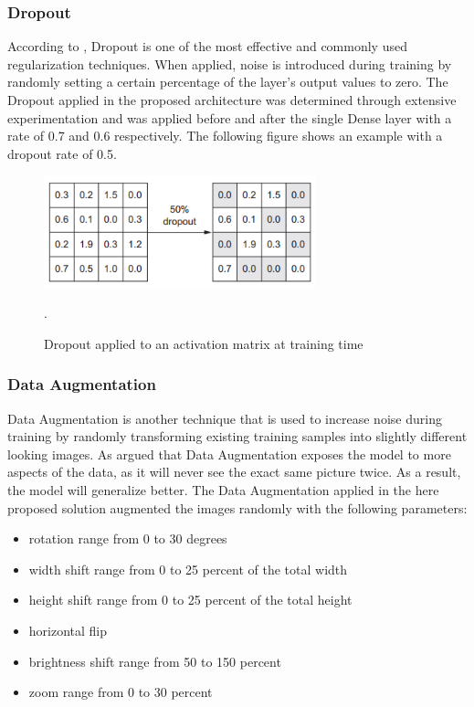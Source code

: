 \subsubsection{Dropout}
According to \citet{Chollet:2017:DeepLearningPython}, Dropout is one of the most effective and commonly used regularization techniques. When applied, noise is introduced during training by randomly setting a certain percentage of the layer's output values to zero. The Dropout applied in the proposed architecture was determined through extensive experimentation and was applied before and after the single Dense layer with a rate of 0.7 and 0.6 respectively. The following figure shows an example with a dropout rate of 0.5.

\begin{figure}[H]
  \begin{center}
  \includegraphics[angle=0, width=0.7\textwidth]{Figures/dropout.PNG}
  \caption{Dropout applied to an activation matrix at training time \citep{Chollet:2017:DeepLearningPython}}.
  \label{fig:Dropout}
  \end{center}
\end{figure}

\subsubsection{Data Augmentation}
Data Augmentation is another technique that is used to increase noise during training by randomly transforming existing training samples into slightly different looking images. As \citet{Chollet:2017:DeepLearningPython} argued that Data Augmentation exposes the model to more aspects of the data, as it will never see the exact same picture twice. As a result, the model will generalize better.
The Data Augmentation applied in the here proposed solution augmented the images randomly with the following parameters:

\begin{itemize}
    \item rotation range from 0 to 30 degrees
    \item width shift range from 0 to 25 percent of the total width
    \item height shift range from 0 to 25 percent of the total height
    \item horizontal flip
    \item brightness shift range from 50 to 150 percent
    \item zoom range from 0 to 30 percent
\end{itemize}



